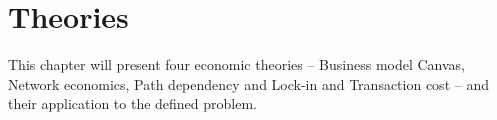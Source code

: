 \section{Theories}
This chapter will present four economic theories -- Business model Canvas, Network economics, Path dependency and Lock-in and Transaction cost -- and their application to the defined problem.




